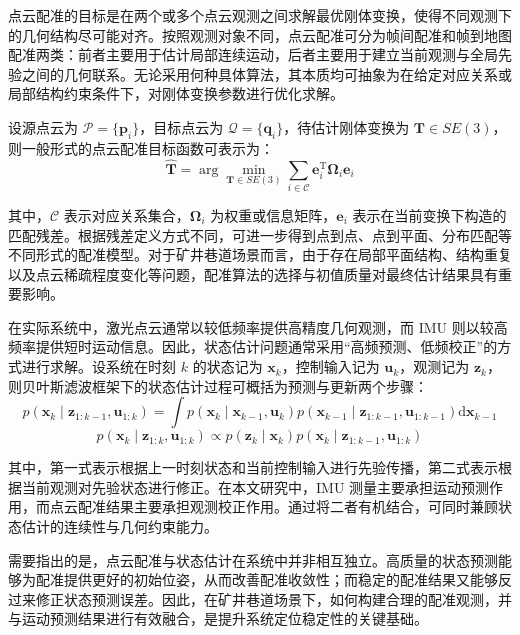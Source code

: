 点云配准的目标是在两个或多个点云观测之间求解最优刚体变换，使得不同观测下的几何结构尽可能对齐。按照观测对象不同，点云配准可分为帧间配准和帧到地图配准两类：前者主要用于估计局部连续运动，后者主要用于建立当前观测与全局先验之间的几何联系。无论采用何种具体算法，其本质均可抽象为在给定对应关系或局部结构约束条件下，对刚体变换参数进行优化求解。

设源点云为 $\mathcal{P}=\{\mathbf{p}_i\}$，目标点云为 $\mathcal{Q}=\{\mathbf{q}_i\}$，待估计刚体变换为 $\mathbf{T}\in SE(3)$，则一般形式的点云配准目标函数可表示为：
\begin{equation}
\hat{\mathbf{T}}
=
\arg \min_{\mathbf{T}\in SE(3)}
\sum_{i\in \mathcal{C}}
\mathbf{e}_{i}^{\mathrm T}
\boldsymbol{\Omega}_{i}
\mathbf{e}_{i}
\end{equation}

其中，$\mathcal{C}$ 表示对应关系集合，$\boldsymbol{\Omega}_{i}$ 为权重或信息矩阵，$\mathbf{e}_{i}$ 表示在当前变换下构造的匹配残差。根据残差定义方式不同，可进一步得到点到点、点到平面、分布匹配等不同形式的配准模型。对于矿井巷道场景而言，由于存在局部平面结构、结构重复以及点云稀疏程度变化等问题，配准算法的选择与初值质量对最终估计结果具有重要影响。

在实际系统中，激光点云通常以较低频率提供高精度几何观测，而 IMU 则以较高频率提供短时运动信息。因此，状态估计问题通常采用“高频预测、低频校正”的方式进行求解。设系统在时刻 $k$ 的状态记为 $\mathbf{x}_{k}$，控制输入记为 $\mathbf{u}_{k}$，观测记为 $\mathbf{z}_{k}$，则贝叶斯滤波框架下的状态估计过程可概括为预测与更新两个步骤：
\begin{equation}
p\left(\mathbf{x}_{k}\mid \mathbf{z}_{1:k-1},\mathbf{u}_{1:k}\right)
=
\int
p\left(\mathbf{x}_{k}\mid \mathbf{x}_{k-1},\mathbf{u}_{k}\right)
p\left(\mathbf{x}_{k-1}\mid \mathbf{z}_{1:k-1},\mathbf{u}_{1:k-1}\right)
\mathrm{d}\mathbf{x}_{k-1}
\end{equation}
\begin{equation}
p\left(\mathbf{x}_{k}\mid \mathbf{z}_{1:k},\mathbf{u}_{1:k}\right)
\propto
p\left(\mathbf{z}_{k}\mid \mathbf{x}_{k}\right)
p\left(\mathbf{x}_{k}\mid \mathbf{z}_{1:k-1},\mathbf{u}_{1:k}\right)
\end{equation}

其中，第一式表示根据上一时刻状态和当前控制输入进行先验传播，第二式表示根据当前观测对先验状态进行修正。在本文研究中，IMU 测量主要承担运动预测作用，而点云配准结果主要承担观测校正作用。通过将二者有机结合，可同时兼顾状态估计的连续性与几何约束能力。

需要指出的是，点云配准与状态估计在系统中并非相互独立。高质量的状态预测能够为配准提供更好的初始位姿，从而改善配准收敛性；而稳定的配准结果又能够反过来修正状态预测误差。因此，在矿井巷道场景下，如何构建合理的配准观测，并与运动预测结果进行有效融合，是提升系统定位稳定性的关键基础。


